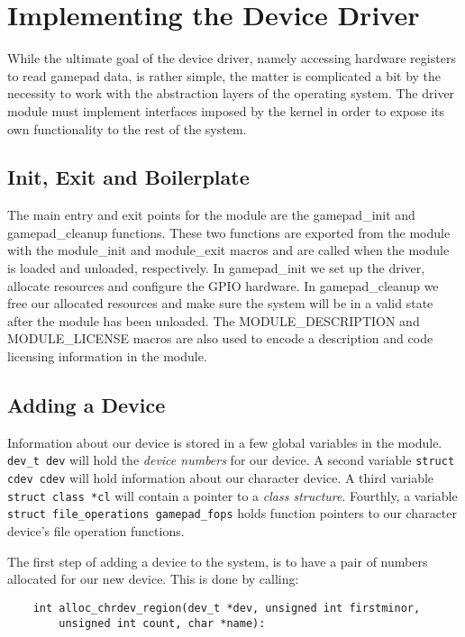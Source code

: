 \section{Implementing the Device Driver}

While the ultimate goal of the device driver, namely accessing hardware
registers to read gamepad data, is rather simple, the matter is complicated a
bit by the necessity to work with the abstraction layers of the operating
system. The driver module must implement interfaces imposed by the kernel in
order to expose its own functionality to the rest of the system.

\subsection{Init, Exit and Boilerplate}

The main entry and exit points for the module are the gamepad\_init and
gamepad\_cleanup functions. These two functions are exported from the module
with the module\_init and module\_exit macros and are called when the module is
loaded and unloaded, respectively. In gamepad\_init we set up the driver,
allocate resources and configure the GPIO hardware. In gamepad\_cleanup we free
our allocated resources and make sure the system will be in a valid state after
the module has been unloaded. The MODULE\_DESCRIPTION and MODULE\_LICENSE macros
are also used to encode a description and code licensing information in the
module.

\subsection{Adding a Device}

Information about our device is stored in a few global variables in the module.
\texttt{dev\_t dev} will hold the \emph{device numbers} for our device.  A
second variable \texttt{struct cdev cdev} will hold information about our
character device. A third variable \texttt{struct class *cl} will contain a
pointer to a \emph{class structure}. Fourthly, a variable \texttt{struct
file\_operations gamepad\_fops} holds function pointers to our character
device's file operation functions.

The first step of adding a device to the system, is to have a pair of numbers
allocated for our new device. This is done by calling:

\begin{lstlisting}
	int alloc_chrdev_region(dev_t *dev, unsigned int firstminor,
		unsigned int count, char *name):
\end{lstlisting}

